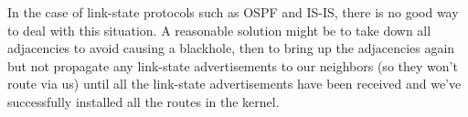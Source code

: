 \documentclass[11pt]{article}
\begin{document}
In the case of link-state protocols such as OSPF and IS-IS, there is
no good way to deal with this situation.  A reasonable solution might
be to take down all adjacencies to avoid causing a blackhole, then to
bring up the adjacencies again but not propagate any link-state
advertisements to our neighbors (so they won't route via us) until all
the link-state advertisements have been received and we've
successfully installed all the routes in the kernel.





\end{document}
